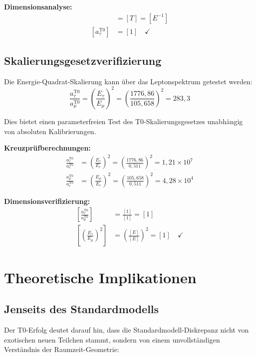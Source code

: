 \documentclass[12pt,a4paper]{report}
\begin{document}
	\textbf{Dimensionsanalyse:}
	\begin{align}
		[\tau_\tau] &= [T] = [E^{-1}] \\
		[a_\tau^{\text{T0}}] &= [1] \quad \checkmark
	\end{align}
	
	\subsection{Skalierungsgesetzverifizierung}
	\label{subsec:scaling_verification}
	
	Die Energie-Quadrat-Skalierung kann über das Leptonspektrum getestet werden:
	\begin{equation}
		\frac{a_\tau^{\text{T0}}}{a_\mu^{\text{T0}}} = \left(\frac{E_\tau}{E_\mu}\right)^2 = \left(\frac{1776,86}{105,658}\right)^2 = 283,3
	\end{equation}
	
	Dies bietet einen parameterfreien Test des T0-Skalierungsgesetzes unabhängig von absoluten Kalibrierungen.
	
	\textbf{Kreuzprüfberechnungen:}
	\begin{align}
		\frac{a_\tau^{\text{T0}}}{a_e^{\text{T0}}} &= \left(\frac{E_\tau}{E_e}\right)^2 = \left(\frac{1776,86}{0,511}\right)^2 = 1,21 \times 10^{7} \\
		\frac{a_\mu^{\text{T0}}}{a_e^{\text{T0}}} &= \left(\frac{E_\mu}{E_e}\right)^2 = \left(\frac{105,658}{0,511}\right)^2 = 4,28 \times 10^{4}
	\end{align}
	
	\textbf{Dimensionsverifizierung:}
	\begin{align}
		\left[\frac{a_\tau^{\text{T0}}}{a_\mu^{\text{T0}}}\right] &= \frac{[1]}{[1]} = [1] \\
		\left[\left(\frac{E_\tau}{E_\mu}\right)^2\right] &= \left(\frac{[E]}{[E]}\right)^2 = [1] \quad \checkmark
	\end{align}
	
	\section{Theoretische Implikationen}
	\label{sec:theoretical_implications}
	
	\subsection{Jenseits des Standardmodells}
	\label{subsec:beyond_standard_model}
	
	Der T0-Erfolg deutet darauf hin, dass die Standardmodell-Diskrepanz nicht von exotischen neuen Teilchen stammt, sondern von einem unvollständigen Verständnis der Raumzeit-Geometrie:
	
\end{document}

